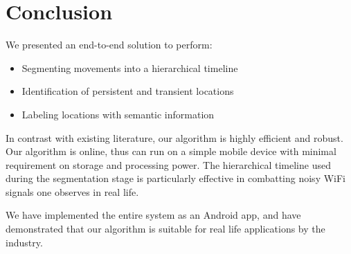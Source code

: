 \section{Conclusion}

We presented an end-to-end solution to perform:

\begin{itemize}
\item Segmenting movements into a hierarchical timeline
\item Identification of persistent and transient locations
\item Labeling locations with semantic information
\end{itemize}

In contrast with existing literature, our algorithm is highly efficient and
robust.  Our algorithm is online, thus can run on a simple mobile device with
minimal requirement on storage and processing power.  The hierarchical timeline
used during the segmentation stage is particularly effective in combatting noisy
WiFi signals one observes in real life.

We have implemented the entire system as an Android app, and have demonstrated
that our algorithm is suitable for real life applications by the industry.
